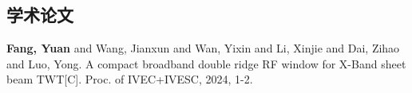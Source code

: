 \documentclass[master]{thesis-uestc}
\begin{document}
\begin{thesistheaccomplish}
    \section{学术论文}
     \textbf{Fang, Yuan} and Wang, Jianxun and Wan, Yixin and Li, Xinjie and Dai, Zihao and Luo, Yong. A compact broadband double ridge RF window for X-Band sheet beam TWT[C]. Proc. of IVEC+IVESC, 2024, 1-2.
\end{thesistheaccomplish}


\end{document}

